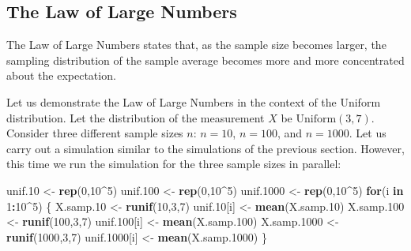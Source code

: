 \documentclass[]{krantz}
\makeatletter
\newenvironment{Shaded}{\begin{snugshade}}{\end{snugshade}}
\newcommand{\ControlFlowTok}[1]{\textcolor[rgb]{0.13,0.29,0.53}{\textbf{#1}}}
\newcommand{\DecValTok}[1]{\textcolor[rgb]{0.00,0.00,0.81}{#1}}
\newcommand{\FloatTok}[1]{\textcolor[rgb]{0.00,0.00,0.81}{#1}}
\newcommand{\KeywordTok}[1]{\textcolor[rgb]{0.13,0.29,0.53}{\textbf{#1}}}
\newcommand{\NormalTok}[1]{#1}
\newcommand{\OperatorTok}[1]{\textcolor[rgb]{0.81,0.36,0.00}{\textbf{#1}}}
\newcommand{\StringTok}[1]{\textcolor[rgb]{0.31,0.60,0.02}{#1}}
\newenvironment{kframe}{%
\medskip{}
\setlength{\fboxsep}{.8em}
 \def\at@end@of@kframe{}%
 \ifinner\ifhmode%
  \def\at@end@of@kframe{\end{minipage}}%
  \begin{minipage}{\columnwidth}%
 \fi\fi%
 \def\FrameCommand##1{\hskip\@totalleftmargin \hskip-\fboxsep
 \colorbox{shadecolor}{##1}\hskip-\fboxsep
     \hskip-\linewidth \hskip-\@totalleftmargin \hskip\columnwidth}%
 \MakeFramed {\advance\hsize-\width
   \@totalleftmargin\z@ \linewidth\hsize
   \@setminipage}}%
 {\par\unskip\endMakeFramed%
 \at@end@of@kframe}
\renewenvironment{Shaded}{\begin{kframe}}{\end{kframe}}
\theoremstyle{definition}
\theoremstyle{definition}
\theoremstyle{definition}
\theoremstyle{remark}
\makeatother
\begin{document}
\hypertarget{the-law-of-large-numbers}{%
\subsection{The Law of Large Numbers}\label{the-law-of-large-numbers}}

The Law of Large Numbers states that, as the sample size becomes larger,
the sampling distribution of the sample average becomes more and more
concentrated about the expectation.

Let us demonstrate the Law of Large Numbers in the context of the
Uniform distribution. Let the distribution of the measurement \(X\) be
\(\mathrm{Uniform}(3,7)\). Consider three different sample sizes \(n\):
\(n=10\), \(n=100\), and \(n=1000\). Let us carry out a simulation similar to
the simulations of the previous section. However, this time we run the
simulation for the three sample sizes in parallel:

\begin{Shaded}
\begin{Highlighting}[]
\NormalTok{unif}\FloatTok{.10}\NormalTok{ <-}\StringTok{ }\KeywordTok{rep}\NormalTok{(}\DecValTok{0}\NormalTok{,}\DecValTok{10}\OperatorTok{^}\DecValTok{5}\NormalTok{)}
\NormalTok{unif}\FloatTok{.100}\NormalTok{ <-}\StringTok{ }\KeywordTok{rep}\NormalTok{(}\DecValTok{0}\NormalTok{,}\DecValTok{10}\OperatorTok{^}\DecValTok{5}\NormalTok{)}
\NormalTok{unif}\FloatTok{.1000}\NormalTok{ <-}\StringTok{ }\KeywordTok{rep}\NormalTok{(}\DecValTok{0}\NormalTok{,}\DecValTok{10}\OperatorTok{^}\DecValTok{5}\NormalTok{)}
\ControlFlowTok{for}\NormalTok{(i }\ControlFlowTok{in} \DecValTok{1}\OperatorTok{:}\DecValTok{10}\OperatorTok{^}\DecValTok{5}\NormalTok{) \{}
\NormalTok{  X.samp}\FloatTok{.10}\NormalTok{ <-}\StringTok{ }\KeywordTok{runif}\NormalTok{(}\DecValTok{10}\NormalTok{,}\DecValTok{3}\NormalTok{,}\DecValTok{7}\NormalTok{)}
\NormalTok{  unif}\FloatTok{.10}\NormalTok{[i] <-}\StringTok{ }\KeywordTok{mean}\NormalTok{(X.samp}\FloatTok{.10}\NormalTok{)}
\NormalTok{  X.samp}\FloatTok{.100}\NormalTok{ <-}\StringTok{ }\KeywordTok{runif}\NormalTok{(}\DecValTok{100}\NormalTok{,}\DecValTok{3}\NormalTok{,}\DecValTok{7}\NormalTok{)}
\NormalTok{  unif}\FloatTok{.100}\NormalTok{[i] <-}\StringTok{ }\KeywordTok{mean}\NormalTok{(X.samp}\FloatTok{.100}\NormalTok{)}
\NormalTok{  X.samp}\FloatTok{.1000}\NormalTok{ <-}\StringTok{ }\KeywordTok{runif}\NormalTok{(}\DecValTok{1000}\NormalTok{,}\DecValTok{3}\NormalTok{,}\DecValTok{7}\NormalTok{)}
\NormalTok{  unif}\FloatTok{.1000}\NormalTok{[i] <-}\StringTok{ }\KeywordTok{mean}\NormalTok{(X.samp}\FloatTok{.1000}\NormalTok{)}
\NormalTok{\}}
\end{Highlighting}
\end{Shaded}
\end{document}
